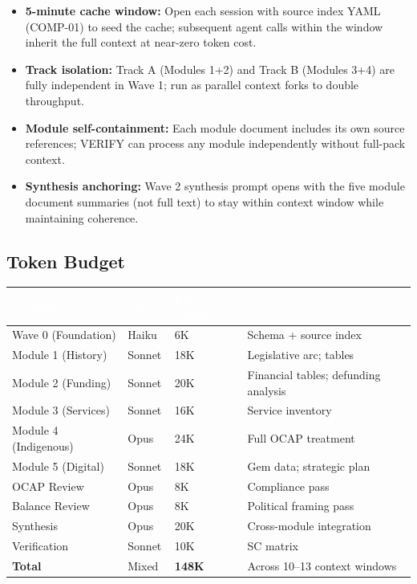 \documentclass[11pt,letterpaper]{article}
\newcommand{\tableheader}[1]{\textbf{\sffamily\textcolor{white}{#1}}}
\begin{document}
\begin{itemize}[noitemsep]
\item \textbf{5-minute cache window:} Open each session with source index YAML (COMP-01) to seed the cache; subsequent agent calls within the window inherit the full context at near-zero token cost.
\item \textbf{Track isolation:} Track A (Modules 1+2) and Track B (Modules 3+4) are fully independent in Wave 1; run as parallel context forks to double throughput.
\item \textbf{Module self-containment:} Each module document includes its own source references; VERIFY can process any module independently without full-pack context.
\item \textbf{Synthesis anchoring:} Wave 2 synthesis prompt opens with the five module document summaries (not full text) to stay within context window while maintaining coherence.
\end{itemize}

\subsection{Token Budget}

\begin{center}
\begin{tabularx}{\textwidth}{L{3cm}C{2cm}C{2cm}X}
\toprule
{}
\tableheader{Component} & \tableheader{Model} & \tableheader{Est. Tokens} & \tableheader{Notes} \\
\midrule
Wave 0 (Foundation) & Haiku & 6K & Schema + source index \\
Module 1 (History) & Sonnet & 18K & Legislative arc; tables \\
Module 2 (Funding) & Sonnet & 20K & Financial tables; defunding analysis \\
Module 3 (Services) & Sonnet & 16K & Service inventory \\
Module 4 (Indigenous) & Opus & 24K & Full OCAP treatment \\
Module 5 (Digital) & Sonnet & 18K & Gem data; strategic plan \\
OCAP Review & Opus & 8K & Compliance pass \\
Balance Review & Opus & 8K & Political framing pass \\
Synthesis & Opus & 20K & Cross-module integration \\
Verification & Sonnet & 10K & SC matrix \\
\midrule
\textbf{Total} & Mixed & \textbf{148K} & Across 10--13 context windows \\
\bottomrule
\end{tabularx}
\end{center}
\end{document}
